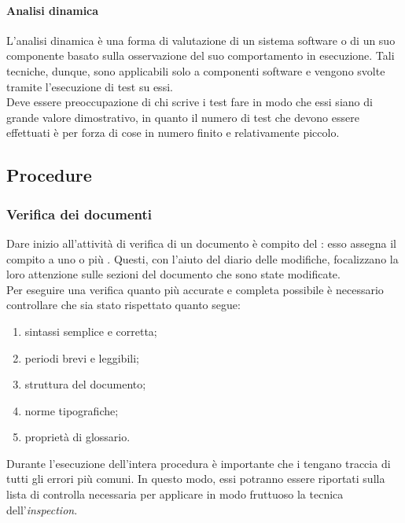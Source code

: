 			\paragraph{Analisi dinamica}
				L'analisi dinamica è una forma di valutazione di un sistema software o di un suo componente basato sulla osservazione del suo comportamento in esecuzione. Tali tecniche, dunque, sono applicabili solo a componenti software e vengono svolte tramite l'esecuzione di test su essi.\\
				Deve essere preoccupazione di chi scrive i test fare in modo che essi siano di grande valore dimostrativo, in quanto il numero di test che devono essere effettuati è per forza di cose in numero finito e relativamente piccolo.
	\subsection{Procedure}
		\subsubsection{Verifica dei documenti}
			Dare inizio all'attività di verifica di un documento è compito del : esso assegna il compito a uno o più . 
			Questi, con l'aiuto del diario delle modifiche, focalizzano la loro attenzione sulle sezioni del documento che sono state modificate.\\
			Per eseguire una verifica quanto più accurate e completa possibile è necessario controllare che sia stato rispettato quanto segue:
			\begin{enumerate}
				\item sintassi semplice e corretta;
				\item periodi brevi e leggibili;
				\item struttura del documento;
				\item norme tipografiche;
				\item proprietà di glossario.
			\end{enumerate}
			Durante l'esecuzione dell'intera procedura è importante che i  tengano traccia di tutti gli errori più comuni. In questo modo, 
			essi potranno essere riportati sulla lista di controlla necessaria per applicare in modo fruttuoso la tecnica dell'\textit{inspection}.
